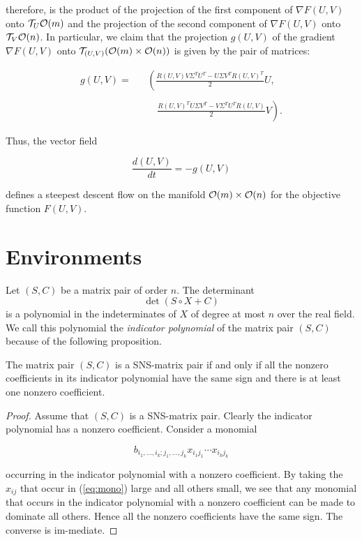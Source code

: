 \documentclass[final,leqno,onetabnum]{siamltex0315}
\begin{document}
therefore, is the product of the projection of the first component of
$\nabla F(U,V)$  onto  ${\cal T}_{U}{\cal O} (m)$  and the projection of the
second component of  $\nabla F(U,V)$  onto  ${\cal T}_{V}{\cal O} (n)$. 
In particular, we claim that the
projection $ g(U,V)$  of the gradient  $\nabla F(U,V)$  onto
${\cal T}_{(U,V)}({\cal O} (m) \times {\cal O} (n))$  is given by the pair of
matrices:
\begin{linenomath*}
\begin{eqnarray}
g(U,V) = && \left( \frac{R(U,V)V\Sigma^{T}U^{T}-U\Sigma V^{T}R(U,V)^{T}}{2}U,
\right.			\nonumber \\[-1.5ex]
\label{eq2.14}\\[-1.5ex]
&&\quad \left. \frac{R(U,V)^{T}U\Sigma V^{T}-V
   \Sigma^{T}U^{T}R(U,V)}{2}V \right).\nonumber
\end{eqnarray}
\end{linenomath*}
Thus, the vector field
\begin{linenomath*}
\begin{equation}
\frac{d(U,V)}{dt} = -g(U,V) 	\label{eq2.15}
\end{equation}
\end{linenomath*}
defines a steepest descent flow on the manifold  ${\cal O} (m) \times
{\cal O} (n)$ for the objective function  $F(U,V)$.

 
\section{Environments}\label{S2}
 
Let $(S,C)$ be a matrix pair of order $n$.  The determinant
\[\det (S\circ X+C)\] 
is a polynomial in the indeterminates of $X$ of degree at
most $n$ over the real field. We call this polynomial the
{\em indicator polynomial} of the matrix pair $(S,C)$
because of the following proposition.
 
\begin{theorem}
\label{th:prop} 
The matrix pair $(S,C)$ is a {\rm SNS}-matrix pair if and
only if all the nonzero coefficients in its indicator
polynomial have the same sign and there is at least one
nonzero coefficient.
\end{theorem} 
 
\begin{proof}
Assume that $(S,C)$ is a SNS-matrix pair.  Clearly the
indicator polynomial has a nonzero coefficient.  Consider a
monomial
\begin{linenomath*}
\begin{equation} 
\label{eq:mono} 
b_{i_{1},\ldots,i_{k};j_{1},\ldots,j_{k}}x_{i_{1}j_{1}}\cdots
x_{i_{k}j_{k}}
\end{equation} 
\end{linenomath*}
occurring in the indicator polynomial with a nonzero
coefficient.  By taking the $x_{ij}$ that occur in
(\ref{eq:mono}) large and all others small, we see that any
monomial that occurs in the indicator polynomial with a
nonzero coefficient can be made to dominate all others.
Hence all the nonzero coefficients have the same sign. The
converse is im-\linebreak mediate. \qquad\end{proof} 
 
\end{document}
